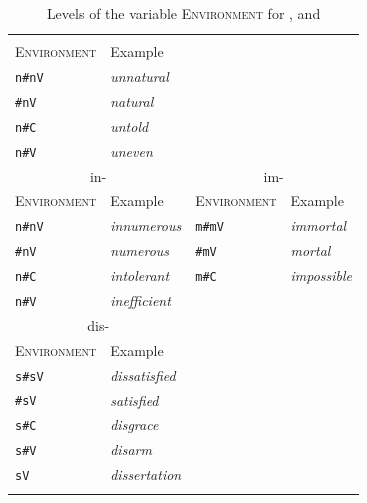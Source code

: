  
 \begin{table}
 	\caption{Levels of the variable \textsc{Environment} for ,  and \label{tbl:Levels of the variable Environment}}
 		\begin{tabular} {llll}
 			\lsptoprule	
 			\multicolumn{2}{c}{un-}&&\\\cmidrule(lr){1-2}
 			\textsc{Environment} & Example & &\\
 			\midrule
 			\texttt{n\#nV}&\color{lsMidBlue}\textit{unnatural} &&\\ 
 			\phantom{n }\texttt{\#nV}&\color{lsMidBlue}\textit{natural}& &\\
 			\texttt{n\#C}&\color{lsMidBlue}\textit{untold} && \\ 
 			\texttt{n\#V}&\color{lsMidBlue}\textit{uneven} &&\\
 			\midrule
 			\multicolumn{2}{c}{in-}&\multicolumn{2}{c}{im-}\\\cmidrule(lr){1-2}\cmidrule(lr){3-4}
 			\textsc{Environment} & Example &\textsc{Environment} & Example\\
 			\midrule
 			\texttt{n\#nV}&\color{lsMidBlue}\textit{innumerous} &\texttt{m\#mV}&\color{lsMidBlue}\textit{immortal}\\ 
 			\phantom{n}\texttt{\#nV}&\color{lsMidBlue}\textit{numerous} &\phantom{n}\texttt{\#mV}&\color{lsMidBlue}\textit{mortal} \\ 
 			\texttt{n\#C}&\color{lsMidBlue}\textit{intolerant} &\texttt{m\#C}&\color{lsMidBlue}\textit{impossible} \\ 
 			\texttt{n\#V}&\color{lsMidBlue}\textit{inefficient}  &  \\ 
 			\midrule     	
 			\multicolumn{2}{c}{dis-}&&\\\cmidrule(lr){1-2}
 			\textsc{Environment}& Example && \\
 			\midrule
 			\texttt{s\#sV}&\color{lsMidBlue}\textit{dissatisfied} && \\ 
 			\phantom{s}\texttt{\#sV}&\color{lsMidBlue}\textit{satisfied} && \\ 
 			\texttt{s\#C}&\color{lsMidBlue}\textit{disgrace} & &\\ 
 			\texttt{s\#V}&\color{lsMidBlue}\textit{disarm} && \\ 
 			\texttt{sV}&\color{lsMidBlue}\textit{dissertation} && \\ 
 			\lspbottomrule 
 		\end{tabular}
 \end{table}
 
